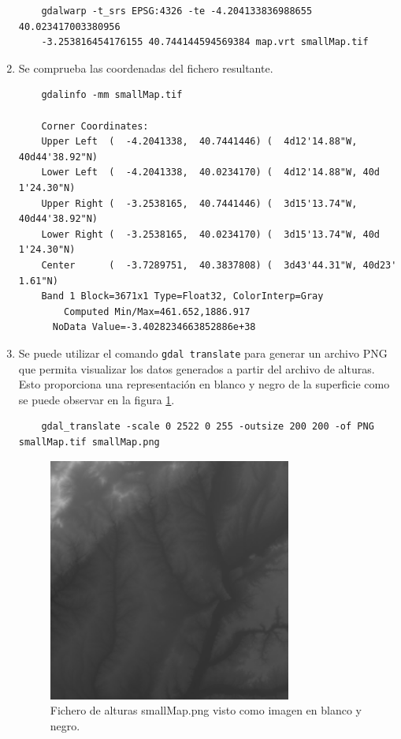 \documentclass[a4paper, 11pt]{book}
\begin{document}
\begin{enumerate}
    {\scriptsize
    \begin{verbatim}
    gdalwarp -t_srs EPSG:4326 -te -4.204133836988655 40.023417003380956
    -3.253816454176155 40.744144594569384 map.vrt smallMap.tif
    \end{verbatim}
    }

    \item Se comprueba las coordenadas del fichero resultante.

    {\scriptsize
    \begin{verbatim}
    gdalinfo -mm smallMap.tif

    Corner Coordinates:
    Upper Left  (  -4.2041338,  40.7441446) (  4d12'14.88"W, 40d44'38.92"N)
    Lower Left  (  -4.2041338,  40.0234170) (  4d12'14.88"W, 40d 1'24.30"N)
    Upper Right (  -3.2538165,  40.7441446) (  3d15'13.74"W, 40d44'38.92"N)
    Lower Right (  -3.2538165,  40.0234170) (  3d15'13.74"W, 40d 1'24.30"N)
    Center      (  -3.7289751,  40.3837808) (  3d43'44.31"W, 40d23' 1.61"N)
    Band 1 Block=3671x1 Type=Float32, ColorInterp=Gray
        Computed Min/Max=461.652,1886.917
      NoData Value=-3.4028234663852886e+38
    \end{verbatim}
    }
    \item Se puede utilizar el comando \texttt{gdal translate} para generar un archivo \textsc{PNG} que permita visualizar los datos generados a partir del archivo de alturas. Esto proporciona una representación en blanco y negro de la superficie como se puede observar en la figura \ref{fig:demImage}.
    {\scriptsize
    \begin{verbatim}
    gdal_translate -scale 0 2522 0 255 -outsize 200 200 -of PNG smallMap.tif smallMap.png
    \end{verbatim}
    }
    
    \begin{figure}[h]
      \centering
      \includegraphics[width=8cm, keepaspectratio]{img/smallMap.png}
      \caption{Fichero de alturas smallMap.png visto como imagen en blanco y negro.}
      \label{fig:demImage}
    \end{figure}


\end{enumerate}
\end{document}
